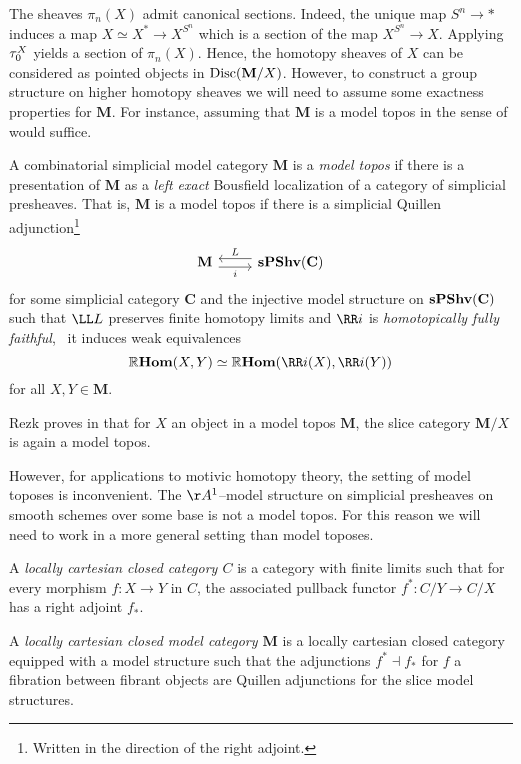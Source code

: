 The sheaves \(\pi_{n}(X)\) admit canonical sections. Indeed, the
unique map \(S^{n}\to *\) induces a map \(X\simeq X^{*}\to X^{S^{n}}\)
which is a section of the map \(X^{S^{n}}\to X\). Applying
\(\tau_{0}^{X}\) yields a section of \(\pi_{n}(X)\). Hence, the
homotopy sheaves of \(X\) can be considered as pointed objects in
\(\operatorname{\textnormal{Disc}}(\mathbf M/X)\). However, to construct a group structure on
higher homotopy sheaves we will need to assume some exactness
properties for \(\mathbf M\). For instance, assuming that \(\mathbf
M\) is a model topos in the sense of \cite{rezkhomotopytoposes} would suffice.

\begin{definition}\label{defn:model-topos}
  A combinatorial simplicial model category \(\mathbf M\) is a
  \emph{model topos} if there is a presentation of \(\mathbf M\) as a
  \emph{left exact} Bousfield localization of a category of simplicial
  presheaves. That is, \(\mathbf M\) is a model topos if there is a
  simplicial Quillen adjunction\footnote{Written in the direction of
    the right adjoint.}
  \[
  \begin{tikzcd}
    \mathbf M \arrow[r, shift right=.7ex, "i"'] & \arrow[l, shift right=.7ex, "L"'] \spshv(\mathbf C)
  \end{tikzcd}
  \]
  for some simplicial category \(\mathbf C\) and the injective model
  structure on \(\operatorname{\textnormal{\bfseries sPShv}}(\mathbf C)\) such that \(\LL L\) preserves
  finite homotopy limits and \(\RR i\) is \emph{homotopically fully
    faithful}, \ie~it induces weak equivalences
  \[
  \RHom(X, Y)\simeq\RHom(\RR i(X), \RR i(Y))
  \]
  for all \(X,Y\in\mathbf M\).
\end{definition}

Rezk proves in \cite[Corollary~6.10]{rezkhomotopytoposes} that for
\(X\) an object in a model topos \(\mathbf M\), the slice category
\(\mathbf M/X\) is again a model topos.

However, for applications to motivic homotopy theory, the setting of
model toposes is inconvenient. The \(\AA^1\)--model structure on
simplicial presheaves on smooth schemes over some base is not a model
topos. For this reason we will need to work in a more general setting
than model toposes.

\begin{definition}
  A \emph{locally cartesian closed category \(C\)} is a category with
  finite limits such that for every morphism \(f\colon X\to Y\) in
  \(C\), the associated pullback functor \(f^{*}\colon C/Y \to C/X\)
  has a right adjoint \(f_{*}\).

  A \emph{locally cartesian closed model category \(\mathbf M\)} is a locally
  cartesian closed category equipped with a model structure such that the
  adjunctions \(f^{*}\dashv f_{*}\) for \(f\) a fibration between fibrant
  objects are Quillen adjunctions for the slice model structures.
\end{definition}

